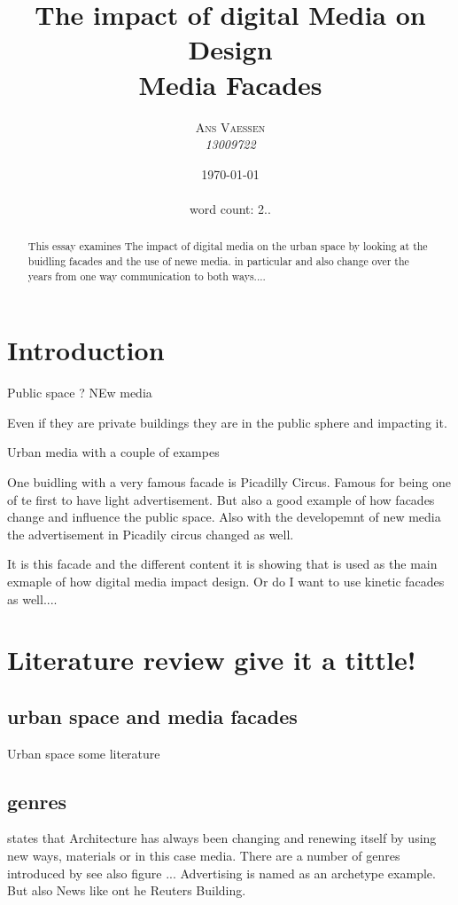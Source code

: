 \documentclass[a4paper, 11pt]{article}
\title{\textbf{The impact of digital Media on Design}\\Media Facades}
\author{\textsc{Ans Vaessen}
\\{\textit{13009722}}}
\date{\today\\ \ \\
word count: 2..}
\begin{document}
\maketitle

\begin{abstract}
This essay examines The impact of digital media on the urban space by looking at the buidling facades and the use of newe media. 
in particular 
and also 
change over the years from one way  communication to both ways....

\end{abstract}

\vspace{30pt} %

\section*{Introduction}
Public space ?
NEw media

Even if they are private buildings they are in the public sphere and impacting it.

Urban media with a couple of exampes

One buidling with a very famous facade is Picadilly Circus. Famous for being one of te first to have light advertisement. But also a good example of how facades change and influence the public space. Also with the developemnt of new media the advertisement in Picadily circus changed as well. 

It is this facade and the different content it is showing that is used as the main exmaple of how digital media impact design.  Or do I want to use kinetic facades as well....

\section{Literature review give it a tittle!}

\subsection{urban space and media facades}
Urban space 
some literature 


\subsection{genres}
\cite{fritsch2008a} states that Architecture has always been changing and renewing itself by using new ways, materials or in this case media. There are a number of genres introduced by \cite{fritsch2008a} see also figure ...
Advertising is named as an archetype example. But also News like ont he Reuters Building. 
\end{document}
